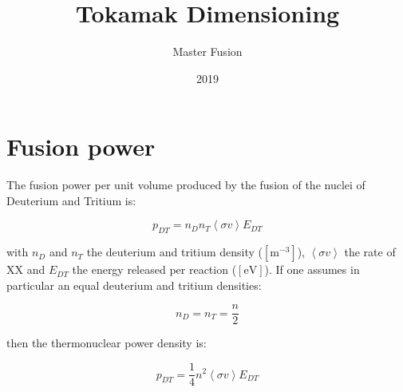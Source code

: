 \documentclass{article}
\title{Tokamak Dimensioning}
\author{Master Fusion}
\date{2019}
\begin{document}
\maketitle

\section{Fusion power}
The fusion power per unit volume produced by the fusion of the nuclei of Deuterium and Tritium is: 

\begin{equation}
    p_{DT} = n_D n_T \left< \sigma v \right> E_{DT}
\end{equation}

with $n_D$ and $n_T$ the deuterium and tritium density ($[\mathrm{m}^{-3}]$), $\left< \sigma v \right>$ the rate of XX and $E_{DT}$ the energy released per reaction ($[\mathrm{eV}]$). If one assumes in particular an equal deuterium and tritium densities:

\begin{equation}
    n_D = n_T = \frac{n}{2}
\end{equation}

then the thermonuclear power density is:

\begin{equation}
        p_{DT} = \frac{1}{4} n^2 \left< \sigma v \right> E_{DT}
\end{equation}
 



%

\end{document}
